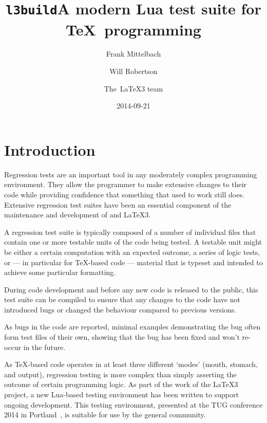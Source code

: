 \documentclass[a4paper]{ltugboat}
\begin{document}
\title{\texttt{l3build}\dash A modern Lua test suite for \TeX\ programming}
\date{2014-09-21}

\author{Frank Mittelbach}
\address{Mainz, Germany}

\author{Will Robertson}
\address{School of Mechanical Engineering, The University of Adelaide, Australia}

\author{The~\LaTeX3 team}

\newcommand\drivername{build.lua}
\newcommand\makename{l3build.lua}
\newcommand\execname{texlua \drivername}

\setcounter{page}{777}

\newcommand\pdfTeX{pdf\TeX}
\newcommand\luaTeX{Lua\TeX}

\maketitle

\tableofcontents

\section{Introduction}

Regression tests are an important tool in any moderately complex
programming environment.  They allow the programmer to make extensive
changes to their code while providing confidence that something that
used to work still does.  Extensive regression test suites have been
an essential component of the maintenance and development of \LaTeXe{}
and \LaTeX3.

A regression test suite is typically composed of a number of
individual files that contain one or more testable units of the code
being tested. A testable unit might be either a certain computation
with an expected outcome, a series of logic tests, or --- in
particular for \TeX{}-based code --- material that is typeset and
intended to achieve some particular formatting.

During code development and before any new code is released to the
public, this test suite can be compiled to ensure that any changes to
the code have not introduced bugs or changed the behaviour compared to
previous versions.

As bugs in the code are reported, minimal examples demonstrating the
bug often form test files of their own, showing that the bug has been
fixed and won't re-occur in the future.

As \TeX{}-based code operates in at least three different `modes'
(mouth, stomach, and output), regression testing is more complex than
simply asserting the outcome of certain programming logic.  As part of
the work of the \LaTeX3 project, a new Lua-based testing environment
has been written to support ongoing development.  This testing
environment, presented at the TUG conference 2014 in
Portland~\cite{Mittelbach:l3buildtalk}, is suitable for use by the
general community.
\end{document}

